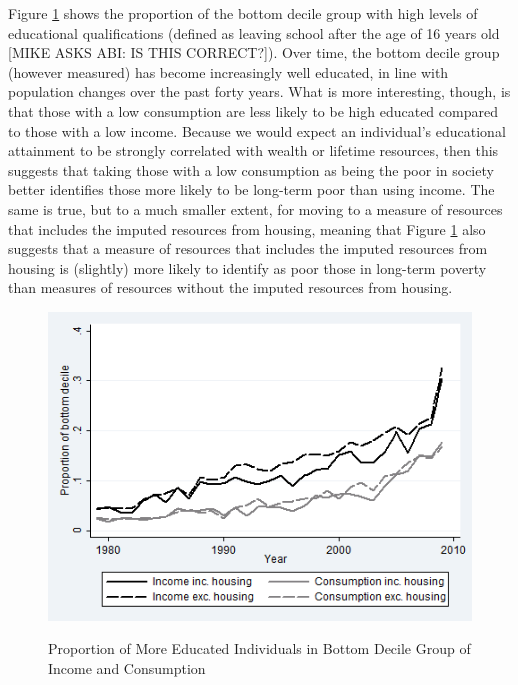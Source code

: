 Figure \ref{fig:pov_comp} shows the proportion of the bottom decile group with high levels of educational qualifications (defined as leaving school after the age of 16 years old [MIKE ASKS ABI: IS THIS CORRECT?]). Over time, the bottom decile group (however measured) has become increasingly well educated, in line with population changes over the past forty years. What is more interesting, though, is that those with a low consumption are less likely to be high educated compared to those with a low income. Because we would expect an individual's educational attainment to be strongly correlated with wealth or lifetime resources, then this suggests that taking those with a low consumption as being the poor in society better identifies those more likely to be long-term poor than using income. The same is true, but to a much smaller extent, for moving to a measure of resources that includes the imputed resources from housing, meaning that Figure \ref{fig:pov_comp} also suggests that a measure of resources that includes the imputed resources from housing is (slightly) more likely to identify as poor those in long-term poverty than measures of resources without the imputed resources from housing.

\begin{figure}
\caption{Proportion of More Educated Individuals in Bottom Decile Group of Income and Consumption}
\centering
\includegraphics[width=.7\linewidth]{pictures/dec_comp4.png}
\label{fig:pov_comp}
\end{figure}


